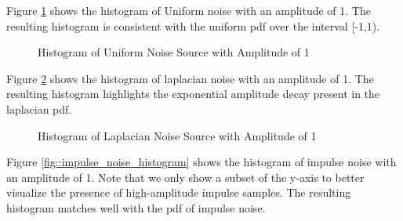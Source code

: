 \documentclass{article}
\begin{document}
Figure \ref{fig::uniform_noise_histogram} shows the histogram of Uniform noise with an amplitude of 1. The resulting histogram is consistent with the uniform pdf over the interval [-1,1).

\begin{figure}[H]
	\centerline{}
	\caption{Histogram of Uniform Noise Source with Amplitude of 1}
	\label{fig::uniform_noise_histogram}
\end{figure}

Figure \ref{fig::laplacian_noise_histogram} shows the histogram of laplacian noise with an amplitude of 1. The resulting histogram highlights the exponential amplitude decay present in the laplacian pdf.

\begin{figure}[H]
	\centerline{}
	\caption{Histogram of Laplacian Noise Source with Amplitude of 1}
	\label{fig::laplacian_noise_histogram}
\end{figure}

Figure \ref{fig::impulse_noise_histogram} shows the histogram of impulse noise with an amplitude of 1. Note that we only show a subset of the y-axis to better visualize the presence of high-amplitude impulse samples. The resulting histogram matches well with the pdf of impulse noise.
\end{document}
